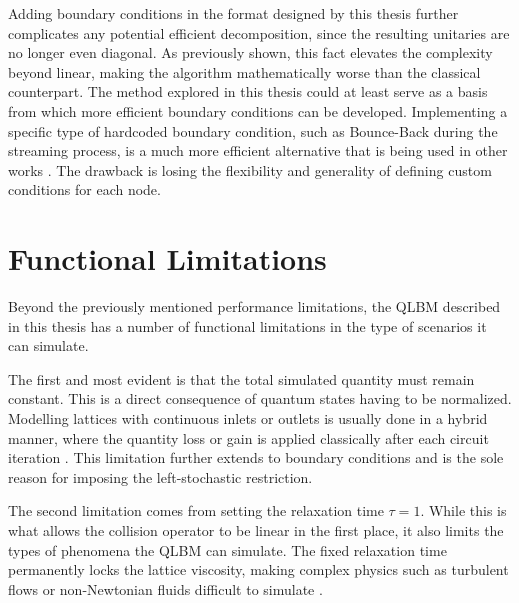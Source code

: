 Adding boundary conditions in the format designed by this thesis further complicates any potential efficient decomposition, since the resulting unitaries are no longer even diagonal.
As previously shown, this fact elevates the complexity beyond linear, making the algorithm mathematically worse than the classical counterpart. 
The method explored in this thesis could at least serve as a basis from which more efficient boundary conditions can be developed.
Implementing a specific type of hardcoded boundary condition, such as Bounce-Back during the streaming process, is a much more efficient alternative that is being used in other works \cite{jennings2026simulating,lee2025advanced}.
The drawback is losing the flexibility and generality of defining custom conditions for each node.

\section{Functional Limitations}

Beyond the previously mentioned performance limitations, the QLBM described in this thesis has a number of functional limitations in the type of scenarios it can simulate.

The first and most evident is that the total simulated quantity must remain constant. 
This is a direct consequence of quantum states having to be normalized.
Modelling lattices with continuous inlets or outlets is usually done in a hybrid manner, where the quantity loss or gain is applied classically after each circuit iteration \cite{jennings2026simulating}.
This limitation further extends to boundary conditions and is the sole reason for imposing the left-stochastic restriction.

The second limitation comes from setting the relaxation time $\tau=1$.
While this is what allows the collision operator to be linear in the first place, it also limits the types of phenomena the QLBM can simulate.
The fixed relaxation time permanently locks the lattice viscosity, making complex physics such as turbulent flows or non-Newtonian fluids difficult to simulate \cite{kruger2016lattice}.